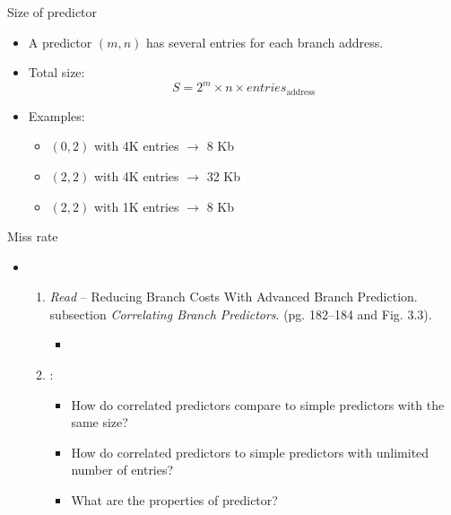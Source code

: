 \begin{frame}[t]{Size of predictor}
\begin{itemize}
  \item A predictor $(m,n)$ has several entries for each branch address.

  \item Total size:
\[
S = 2^m \times n \times entries_{\text{address}}
\]

  \item Examples:
    \begin{itemize}
      \item $(0,2)$ with 4K entries $\rightarrow$ 8 Kb
      \item $(2,2)$ with 4K entries $\rightarrow$ 32 Kb
      \item $(2,2)$ with 1K entries $\rightarrow$ 8 Kb
   \end{itemize}
\end{itemize}
\end{frame}

\begin{frame}[t]{Miss rate}
\begin{itemize}
  \item {}
    \begin{enumerate}
      \item \emph{Read}  -- 
            Reducing Branch Costs With Advanced Branch Prediction.\\
             subsection \emph{Correlating Branch Predictors}. 
            (pg. 182--184 and Fig. 3.3).
        \begin{itemize}
          \item \bibhennessy
        \end{itemize}

      \item {}:
        \begin{itemize}
          \item How do correlated predictors compare to simple predictors with the same size?
          \item How do correlated predictors to simple predictors with unlimited number of entries?
          \item What are the properties of  predictor?
        \end{itemize}
    \end{enumerate}
\end{itemize}
\end{frame}


